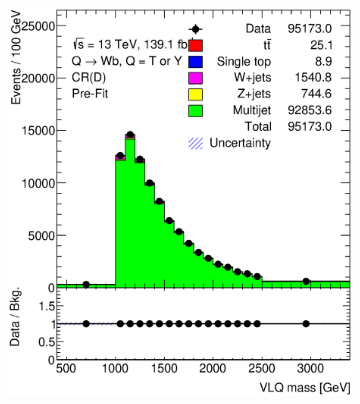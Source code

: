 \begin{figure}[hbt!]
\begin{subfigure}{.35\textwidth}
		\caption{}
		\label{fig:app:cr_d:jet_pt}
	\end{subfigure}
	\begin{subfigure}{.35\textwidth}
		\centering
		\includegraphics[width=\linewidth,height=\textheight,keepaspectratio]{CR_D_VLQM.eps}
		\caption{}
		\label{fig:app:cr_d:VLQM}
	\end{subfigure}\hspace{0.6cm}
	\begin{subfigure}{.35\textwidth}
		\centering

\end{subfigure}
\end{figure}
